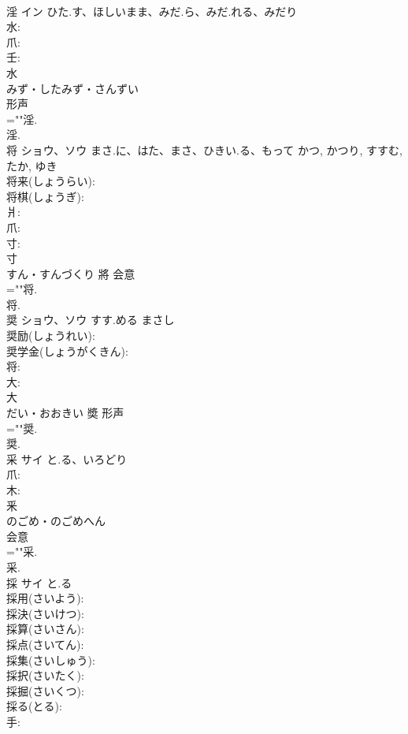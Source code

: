 \documentclass[8pt]{extreport}
\begin{document}
\begin{CJK}{UTF8}{min}
\\	淫	イン	ひた.す、ほしいまま、みだ.ら、みだ.れる、みだり		
\\	水: 
\\	爪: 
\\	壬: 
\\	水	
\\	みず・したみず・さんずい	
\\	形声 
\\	=""淫.
\\	淫.
\\	将	ショウ、ソウ	まさ.に、はた、まさ、ひきい.る、もって	かつ, かつり, すすむ, たか, ゆき	
\\	将来(しょうらい): 
\\	将棋(しょうぎ): 
\\	爿: 
\\	爪: 
\\	寸: 
\\	寸	
\\	すん・すんづくり	將	会意 
\\	=""将.
\\	将.
\\	奨	ショウ、ソウ	すす.める	まさし	
\\	奨励(しょうれい): 
\\	奨学金(しょうがくきん): 
\\	将: 
\\	大: 
\\	大	
\\	だい・おおきい	奬	形声 
\\	=""奨.
\\	奨.
\\	采	サイ	と.る、いろどり		
\\	爪: 
\\	木: 
\\	釆	
\\	のごめ・のごめへん	
\\	会意 
\\	=""采.
\\	采.
\\	採	サイ	と.る		
\\	採用(さいよう): 
\\	採決(さいけつ): 
\\	採算(さいさん): 
\\	採点(さいてん): 
\\	採集(さいしゅう): 
\\	採択(さいたく): 
\\	採掘(さいくつ): 
\\	採る(とる): 
\\	手: 

\end{CJK}
\end{document}
